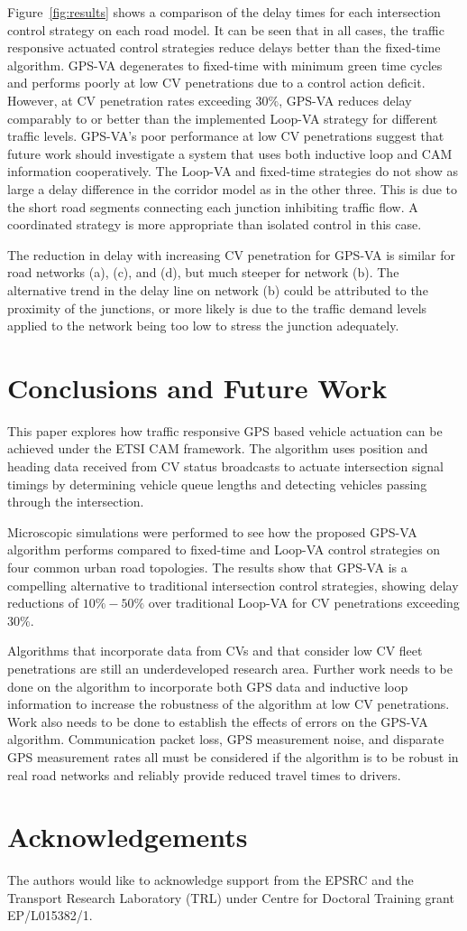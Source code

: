 \documentclass[numbered]{trbunofficial}
\begin{document}
Figure~\ref{fig:results} shows a comparison of the delay times for each intersection control strategy on each road model. It can be seen that in all cases, the traffic responsive actuated control strategies reduce delays better than the fixed-time algorithm. GPS-VA degenerates to fixed-time with minimum green time cycles and performs poorly at low CV penetrations due to a control action deficit. However, at CV penetration rates exceeding $30\%$, GPS-VA reduces delay comparably to or better than the implemented Loop-VA strategy for different traffic levels. GPS-VA's poor performance at low CV penetrations suggest that future work should investigate a system that uses both inductive loop and CAM information cooperatively. The Loop-VA and fixed-time strategies do not show as large a delay difference in the corridor model as in the other three. This is due to the short road segments connecting each junction inhibiting traffic flow. A coordinated strategy is more appropriate than isolated control in this case.

The reduction in delay with increasing CV penetration for GPS-VA is similar for road networks (a), (c), and (d), but much steeper for network (b). The alternative trend in the delay line on network (b) could be attributed to the proximity of the junctions, or more likely is due to the traffic demand levels applied to the network being too low to stress the junction adequately.

\section{Conclusions and Future Work}\label{sec:conclusion}
This paper explores how traffic responsive GPS based vehicle actuation can be achieved under the ETSI CAM framework. The algorithm uses position and heading data received from CV status broadcasts to actuate intersection signal timings by determining vehicle queue lengths and detecting vehicles passing through the intersection.

Microscopic simulations were performed to see how the proposed GPS-VA algorithm performs compared to fixed-time and Loop-VA control strategies on four common urban road topologies. 
The results show that GPS-VA is a compelling alternative to traditional intersection control strategies, showing delay reductions of $10\%-50\%$ over traditional Loop-VA for CV penetrations exceeding $30\%$.

Algorithms that incorporate data from CVs and that consider low CV fleet penetrations are still an underdeveloped research area. Further work needs to be done on the algorithm to incorporate both GPS data and inductive loop information to increase the robustness of the algorithm at low CV penetrations. Work also needs to be done to establish the effects of errors on the GPS-VA algorithm. Communication packet loss, GPS measurement noise, and disparate GPS measurement rates all must be considered if the algorithm is to be robust in real road networks and reliably provide reduced travel times to drivers.

\section{Acknowledgements}
The authors would like to acknowledge support from the EPSRC and the Transport Research Laboratory (TRL) under Centre for Doctoral Training grant EP/L015382/1.

\newpage



\end{document}
